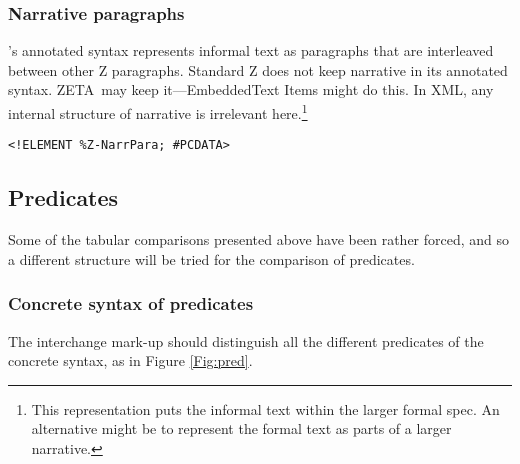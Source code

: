 \documentclass[a4paper,10pt]{article}
\def\Zeta{{\sf Z{\small E}T{\small A}}}
\begin{document}
\subsubsection{Narrative paragraphs}

\CADiZ's annotated syntax represents informal text as paragraphs
that are interleaved between other Z paragraphs.
Standard Z does not keep narrative in its annotated syntax.
\Zeta\ may keep it---EmbeddedText Items might do this.
In XML, any internal structure of narrative is irrelevant here.\footnote{%
This representation puts the informal text within the larger formal spec.
An alternative might be to represent the formal text
as parts of a larger narrative.}

\begin{verbatim}
<!ELEMENT %Z-NarrPara; #PCDATA>
\end{verbatim}

\subsection{Predicates}

Some of the tabular comparisons presented above have been rather forced,
and so a different structure will be tried for the comparison of predicates.

\subsubsection{Concrete syntax of predicates}

The interchange mark-up should distinguish all the different predicates
of the concrete syntax, as in Figure \ref{Fig:pred}.
\end{document}
